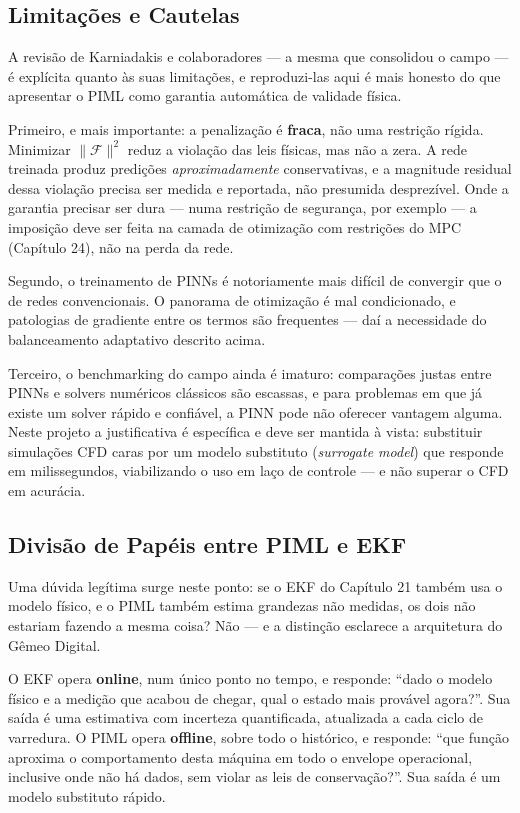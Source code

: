 \documentclass[12pt,a4paper]{article}
\numberwithin{equation}{section}
\numberwithin{table}{section}
\numberwithin{figure}{section}
\begin{document}
{	\subsection{Limitações e Cautelas}

	A revisão de Karniadakis e colaboradores \cite{piml2} — a mesma que consolidou o campo — é explícita quanto às suas limitações, e reproduzi-las aqui é mais honesto do que apresentar o PIML como garantia automática de validade física.

	Primeiro, e mais importante: a penalização é \textbf{fraca}, não uma restrição rígida. Minimizar $\| \mathcal{F} \|^2$ reduz a violação das leis físicas, mas não a zera. A rede treinada produz predições \textit{aproximadamente} conservativas, e a magnitude residual dessa violação precisa ser medida e reportada, não presumida desprezível. Onde a garantia precisar ser dura — numa restrição de segurança, por exemplo — a imposição deve ser feita na camada de otimização com restrições do MPC (Capítulo 24), não na perda da rede.

	Segundo, o treinamento de PINNs é notoriamente mais difícil de convergir que o de redes convencionais. O panorama de otimização é mal condicionado, e patologias de gradiente entre os termos são frequentes — daí a necessidade do balanceamento adaptativo descrito acima.

	Terceiro, o benchmarking do campo ainda é imaturo: comparações justas entre PINNs e solvers numéricos clássicos são escassas, e para problemas em que já existe um solver rápido e confiável, a PINN pode não oferecer vantagem alguma. Neste projeto a justificativa é específica e deve ser mantida à vista: substituir simulações CFD caras por um modelo substituto (\textit{surrogate model}) que responde em milissegundos, viabilizando o uso em laço de controle — e não superar o CFD em acurácia.

	\subsection{Divisão de Papéis entre PIML e EKF}

	Uma dúvida legítima surge neste ponto: se o EKF do Capítulo 21 também usa o modelo físico, e o PIML também estima grandezas não medidas, os dois não estariam fazendo a mesma coisa? Não — e a distinção esclarece a arquitetura do Gêmeo Digital.

	O EKF opera \textbf{online}, num único ponto no tempo, e responde: ``dado o modelo físico e a medição que acabou de chegar, qual o estado mais provável agora?''. Sua saída é uma estimativa com incerteza quantificada, atualizada a cada ciclo de varredura. O PIML opera \textbf{offline}, sobre todo o histórico, e responde: ``que função aproxima o comportamento desta máquina em todo o envelope operacional, inclusive onde não há dados, sem violar as leis de conservação?''. Sua saída é um modelo substituto rápido.

}
\end{document}
